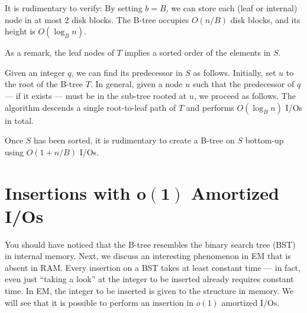 It is rudimentary to verify:
By setting $b = B$, we can store each (leaf or internal) node in at most 2 disk blocks. The  B-tree occupies $O(n/B)$ disk blocks, and its height is $O(\log_B n)$.

\vgap

As a remark, the leaf nodes of $T$ implies a sorted order of the elements in $S$.

 Given an integer $q$, we can find its predecessor in $S$ as follows. Initially, set $u$ to the root of the B-tree $T$. In general, given a node $u$ such that the predecessor of $q$ --- if it exists --- must be in the sub-tree rooted at $u$, we proceed as follows.
The algorithm descends a single root-to-leaf path of $T$ and  performs $O(\log_B n)$ I/Os in total.

 Once $S$ has been sorted, it is rudimentary to create a B-tree on $S$ bottom-up using $O(1 + n/B)$ I/Os.

\section{Insertions with $\bm{o(1)}$ Amortized I/Os} \label{sec:log-method}

You should have noticed that the B-tree resembles the binary search tree (BST) in internal memory. Next, we discuss an interesting phenomenon in EM that is absent in RAM. Every insertion on a BST takes at least constant time --- in fact, even just ``taking a look'' at the integer to be inserted already requires constant time. In EM, the integer to be inserted is given to the structure in memory. We will see that it is possible to perform an insertion in $o(1)$ amortized I/Os.


